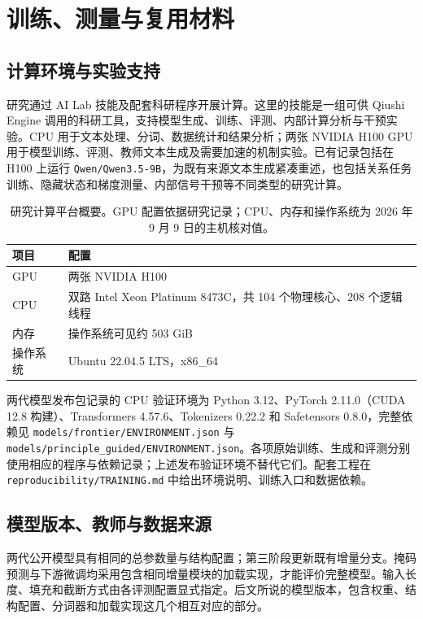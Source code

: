 \section{训练、测量与复用材料}
\label{app:repro}

\subsection{计算环境与实验支持}
\label{app:compute}

研究通过 AI Lab 技能及配套科研程序开展计算。这里的技能是一组可供 Qiushi Engine 调用的科研工具，支持模型生成、训练、评测、内部计算分析与干预实验。CPU 用于文本处理、分词、数据统计和结果分析；两张 NVIDIA H100 GPU 用于模型训练、评测、教师文本生成及需要加速的机制实验。已有记录包括在 H100 上运行 \nolinkurl{Qwen/Qwen3.5-9B}，为既有来源文本生成紧凑重述，也包括关系任务训练、隐藏状态和梯度测量、内部信号干预等不同类型的研究计算。

\begin{table}[htbp]
\caption{研究计算平台概要。GPU 配置依据研究记录；CPU、内存和操作系统为 2026 年 9 月 9 日的主机核对值。}
\label{tab:compute_platform}
\small
\begin{tabularx}{\linewidth}{@{}P{28mm}Y@{}}
\toprule 项目 & 配置\\\midrule
GPU & 两张 NVIDIA H100\\
CPU & 双路 Intel Xeon Platinum 8473C，共 104 个物理核心、208 个逻辑线程\\
内存 & 操作系统可见约 503 GiB\\
操作系统 & Ubuntu 22.04.5 LTS，x86\_64\\
\bottomrule
\end{tabularx}
\end{table}

两代模型发布包记录的 CPU 验证环境为 Python 3.12、PyTorch 2.11.0（CUDA 12.8 构建）、Transformers 4.57.6、Tokenizers 0.22.2 和 Safetensors 0.8.0，完整依赖见 \nolinkurl{models/frontier/ENVIRONMENT.json} 与 \nolinkurl{models/principle_guided/ENVIRONMENT.json}。各项原始训练、生成和评测分别使用相应的程序与依赖记录；上述发布验证环境不替代它们。配套工程在 \nolinkurl{reproducibility/TRAINING.md} 中给出环境说明、训练入口和数据依赖。

\subsection{模型版本、教师与数据来源}

两代公开模型具有相同的总参数量与结构配置；第三阶段更新既有增量分支。掩码预测与下游微调均采用包含相同增量模块的加载实现，才能评价完整模型。输入长度、填充和截断方式由各评测配置显式指定。后文所说的模型版本，包含权重、结构配置、分词器和加载实现这几个相互对应的部分。

